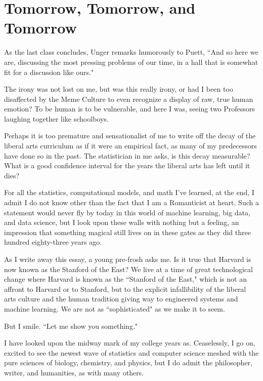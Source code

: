 \documentclass[12pt,letterpaper]{article}
\begin{document}

\section*{Tomorrow, Tomorrow, and Tomorrow}
As the last class concludes, Unger remarks humorously to Puett, ``And so here we are, discussing the most pressing problems of our time, in a hall that is somewhat fit for a discussion like ours."  

The irony was not lost on me, but was this really irony, or had I been too disaffected by the Meme Culture to even recognize a display of raw, true human emotion?  To be human is to be vulnerable, and here I was, seeing two Professors laughing together like schoolboys.

Perhaps it is too premature and sensationalist of me to write off the decay of the liberal arts curriculum as if it were an empirical fact, as many of my predecessors have done so in the past.  The statistician in me asks, is this decay measurable?  What is a good confidence interval for the years the liberal arts has left until it dies?

For all the statistics, computational models, and math I've learned, at the end, I admit I do not know other than the fact that I am a Romanticist at heart.  Such a statement would never fly by today in this world of machine learning, big data, and data science, but I look upon these walls with nothing but a feeling, an impression that something magical still lives on in these gates as they did three hundred eighty-three years ago.  

As I write away this essay, a young pre-frosh asks me.  Is it true that Harvard is now known as the Stanford of the East?  We live at a time of great technological change where Harvard is known as the ``Stanford of the East," which is not an affront to Harvard or to Stanford, but to the explicit infallibility of the liberal arts culture and the human tradition giving way to engineered systems and machine learning.  We are not as ``sophisticated" as we make it to seem.  

But I smile.  ``Let me show you something."  


I have looked upon the midway mark of my college years as.  Ceaselessly, I go on, excited to see the newest wave of statistics and computer science meshed with the pure sciences of biology, chemistry, and physics, but I do admit the philosopher, writer, and humanities, as with many others.  
\end{document}
